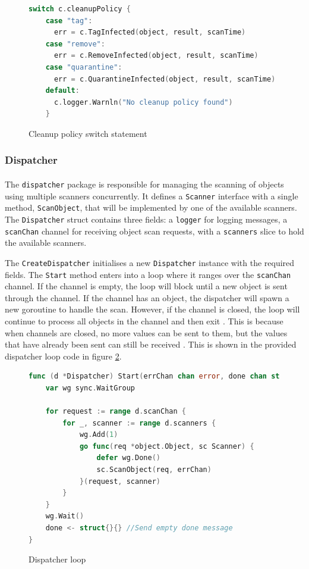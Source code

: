 \documentclass[12pt, conference, final, a4paper, onecolumn, compsoc]{IEEEtran}
\begin{document}
\begin{figure}[H]
\begin{lstlisting}[language=Go]
    switch c.cleanupPolicy {
    case "tag":
      err = c.TagInfected(object, result, scanTime)
    case "remove":
      err = c.RemoveInfected(object, result, scanTime)
    case "quarantine":
      err = c.QuarantineInfected(object, result, scanTime)
    default:
      c.logger.Warnln("No cleanup policy found")
    }
\end{lstlisting}
  \caption{Cleanup policy switch statement}
  \label{fig:cleaner-switch}
\end{figure}

\subsubsection*{Dispatcher}
\paragraph{}
%

The \texttt{dispatcher} package is responsible for managing the scanning of
objects using multiple scanners concurrently. It defines a \texttt{Scanner}
interface with a single method, \texttt{ScanObject}, that will be implemented by
one of the available scanners. The \texttt{Dispatcher} struct contains three
fields: a \texttt{logger} for logging messages, a \texttt{scanChan} channel for
receiving object scan requests, with a \texttt{scanners} slice to hold the
available scanners.

The \texttt{CreateDispatcher} initialises a new \texttt{Dispatcher} instance
with the required fields. The \texttt{Start} method enters into a loop where it
ranges over the \texttt{scanChan} channel. If the channel is empty, the loop
will block until a new object is sent through the channel. If the channel has an
object, the dispatcher will spawn a new goroutine to handle the scan. However,
if the channel is closed, the loop will continue to process all objects in the
channel and then exit \citep{go-channel-ranges}. This is because when channels
are closed, no more values can be sent to them, but the values that have already
been sent can still be received \citep{go-closing-channels}. This is shown in
the provided dispatcher loop code in figure \ref{fig:dispatcher-loop}.

\begin{figure}[H]
\begin{lstlisting}[language=Go]
func (d *Dispatcher) Start(errChan chan error, done chan struct{}) {
	var wg sync.WaitGroup

	for request := range d.scanChan {
		for _, scanner := range d.scanners {
			wg.Add(1)
			go func(req *object.Object, sc Scanner) {
				defer wg.Done()
				sc.ScanObject(req, errChan)
			}(request, scanner)
		}
	}
	wg.Wait()
	done <- struct{}{} //Send empty done message
}
\end{lstlisting}
  \caption{Dispatcher loop}
  \label{fig:dispatcher-loop}
\end{figure}
\end{document}
